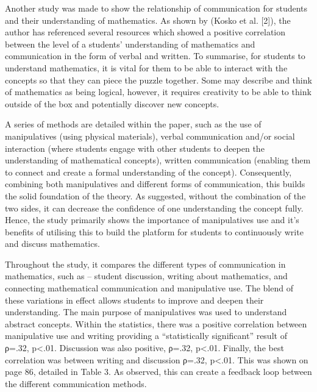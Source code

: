 \documentclass[12pt, a4paper,oneside]{book}
\numberwithin{equation}{section}
\begin{document}
Another study was made to show the relationship of communication for students and their understanding of mathematics. As shown by (Kosko et al. [2]), the author has referenced several resources which showed a positive correlation between the level of a students’ understanding of mathematics and communication in the form of verbal and written. To summarise, for students to understand mathematics, it is vital for them to be able to interact with the concepts so that they can piece the puzzle together. Some may describe and think of mathematics as being logical, however, it requires creativity to be able to think outside of the box and potentially discover new concepts.

A series of methods are detailed within the paper, such as the use of manipulatives (using physical materials), verbal communication and/or social interaction (where students engage with other students to deepen the understanding of mathematical concepts), written communication (enabling them to connect and create a formal understanding of the concept). Consequently, combining both manipulatives and different forms of communication, this builds the solid foundation of the theory. As suggested, without the combination of the two sides, it can decrease the confidence of one understanding the concept fully. Hence, the study primarily shows the importance of manipulatives use and it’s benefits of utilising this to build the platform for students to continuously write and discuss mathematics.

Throughout the study, it compares the different types of communication in mathematics, such as – student discussion, writing about mathematics, and connecting mathematical communication and manipulative use. The blend of these variations in effect allows students to improve and deepen their understanding. The main purpose of manipulatives was used to understand abstract concepts. Within the statistics, there was a positive correlation between manipulative use and writing providing a “statistically significant” result of ρ=.32, p<.01. Discussion was also positive, ρ=.32, p<.01. Finally, the best correlation was between writing and discussion ρ=.32, p<.01. This was shown on page 86, detailed in Table 3. As observed, this can create a feedback loop between the different communication methods.
\end{document}
